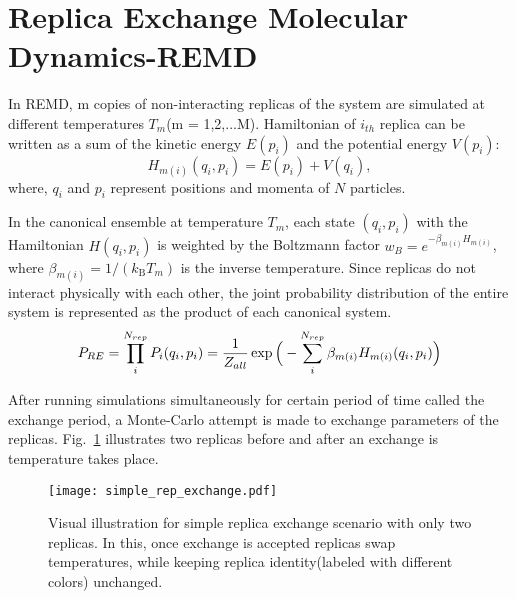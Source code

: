 \documentclass[../talant.diss.submit.tex]{subfiles}
\begin{document}
%
\section{\textbf{Replica Exchange Molecular Dynamics-REMD}}\label{sect:two_eight}
%
In REMD, m copies of non-interacting replicas of the system are simulated at different
temperatures $T_m$(m = 1,2,...M). Hamiltonian of $i_{th}$ replica can be written as a sum
of the kinetic energy $E(p_i)$ and the potential energy $V(p_i)$:
%
\begin{equation}
  \label{eq:rep_hamil}
  H_{m(i)}(q_i ,p_i) =  E(p_i) + V(q_i),
\end{equation}
%
%
where, $q_i$ and $p_i$ represent positions and momenta of $N$ particles.

In the canonical ensemble at temperature $T_m$, each state $(q_i,p_i)$ with the Hamiltonian
$H(q_i,p_i)$ is weighted by the Boltzmann factor $w_B = e^{-\beta_{m(i)} H_{m(i)}}$, where
$\beta_{m(i)} = 1 /(k_{\mathrm{B}} T_m)$ is the inverse temperature. 
Since replicas do not interact physically with each other, the joint probability distribution of
the entire system is represented as the product of each canonical system.
%
%
\begin{equation}
  \label{eq:rep_distribution}
  P_{RE} =  \prod \limits_{i}^{N_{rep}} P_i(q_i,p_i) = \\
  \frac{1}{Z_{all}} \exp{ \Big( -\sum \limits_{i}^{N_{rep}} \beta_{m(i)} H_{m(i)}(q_i,p_i) \Big) }
\end{equation}
%
%

After running simulations simultaneously for certain period of time called the exchange period,
a Monte-Carlo attempt is made to exchange parameters of the replicas.
Fig.~\ref{fig:simple_rep_exchange} illustrates two replicas before and after an exchange is temperature
takes place.
%
%        
\begin{figure}[htp!]
  \begin{centering}
    \texttt{[image: simple\_rep\_exchange.pdf]}
    \caption{Visual illustration for simple replica exchange scenario
      with only two replicas. In this, once exchange is accepted replicas
      swap temperatures, while keeping replica identity(labeled with different colors)
      unchanged.}                
    \label{fig:simple_rep_exchange} 
  \end{centering}                                                                                          
\end{figure}
\end{document}
